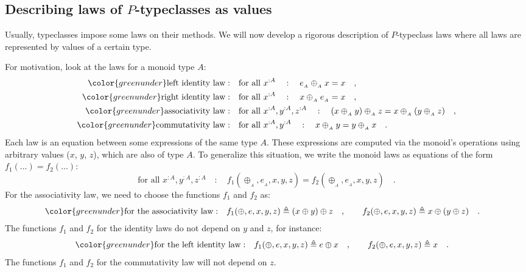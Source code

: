 \subsection{Describing laws of $P$-typeclasses as values\label{subsec:Describing-laws-of-P-typeclasses-as-values}}

Usually, typeclasses impose some laws on their methods. We will now
develop a rigorous description of $P$-typeclass laws where all laws
are represented by values of a certain type.

For motivation, look at the laws for a monoid type $A$:
\begin{align*}
{\color{greenunder}\text{left identity law}:}\quad & \text{for all }x^{:A}\quad:\quad e_{_{A}}\oplus_{_{A}}x=x\quad,\\
{\color{greenunder}\text{right identity law}:}\quad & \text{for all }x^{:A}\quad:\quad x\oplus_{_{A}}e_{_{A}}=x\quad,\\
{\color{greenunder}\text{associativity law}:}\quad & \text{for all }x^{:A},y^{:A},z^{:A}\quad:\quad(x\oplus_{_{A}}y)\oplus_{_{A}}z=x\oplus_{_{A}}(y\oplus_{_{A}}z)\quad,\\
{\color{greenunder}\text{commutativity law}:}\quad & \text{for all }x^{:A},y^{:A}\quad:\quad x\oplus_{_{A}}y=y\oplus_{_{A}}x\quad.
\end{align*}
Each law is an equation between some expressions of the same type
$A$. These expressions are computed via the monoid\textsf{'}s operations using
arbitrary values ($x$, $y$, $z$), which are also of type $A$.
To generalize this situation, we write the monoid laws as equations
of the form $f_{1}(...)=f_{2}(...)$:
\[
\text{for all }x^{:A},y^{:A},z^{:A}\quad:\quad f_{1}(\oplus_{_{A}},e_{_{A}},x,y,z)=f_{2}(\oplus_{_{A}},e_{_{A}},x,y,z)\quad.
\]
For the associativity law, we need to choose the functions $f_{1}$
and $f_{2}$ as:
\begin{align*}
{\color{greenunder}\text{for the associativity law}:}\quad & f_{1}(\oplus,e,x,y,z)\triangleq(x\oplus y)\oplus z\quad,\quad\quad f_{2}(\oplus,e,x,y,z)\triangleq x\oplus(y\oplus z)\quad.
\end{align*}
The functions $f_{1}$ and $f_{2}$ for the identity laws do not depend
on $y$ and $z$, for instance:
\begin{align*}
{\color{greenunder}\text{for the left identity law}:}\quad & f_{1}(\oplus,e,x,y,z)\triangleq e\oplus x\quad,\quad\quad f_{2}(\oplus,e,x,y,z)\triangleq x\quad.
\end{align*}
The functions $f_{1}$ and $f_{2}$ for the commutativity law will
not depend on $z$.


